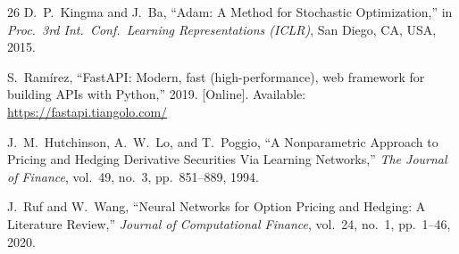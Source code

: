 \documentclass[conference]{IEEEtran}
\begin{document}
\begin{thebibliography}{26}
 D.~P.~Kingma and J.~Ba, ``Adam: A Method for Stochastic Optimization,'' in \textit{Proc.\ 3rd Int.\ Conf.\ Learning Representations (ICLR)}, San Diego, CA, USA, 2015.

 S.~Ram\'irez, ``FastAPI: Modern, fast (high-performance), web framework for building APIs with Python,'' 2019. [Online]. Available: \url{https://fastapi.tiangolo.com/}

 J.~M.~Hutchinson, A.~W.~Lo, and T.~Poggio, ``A Nonparametric Approach to Pricing and Hedging Derivative Securities Via Learning Networks,'' \textit{The Journal of Finance}, vol.~49, no.~3, pp.~851--889, 1994.

 J.~Ruf and W.~Wang, ``Neural Networks for Option Pricing and Hedging: A Literature Review,'' \textit{Journal of Computational Finance}, vol.~24, no.~1, pp.~1--46, 2020.

\end{thebibliography}
\end{document}
